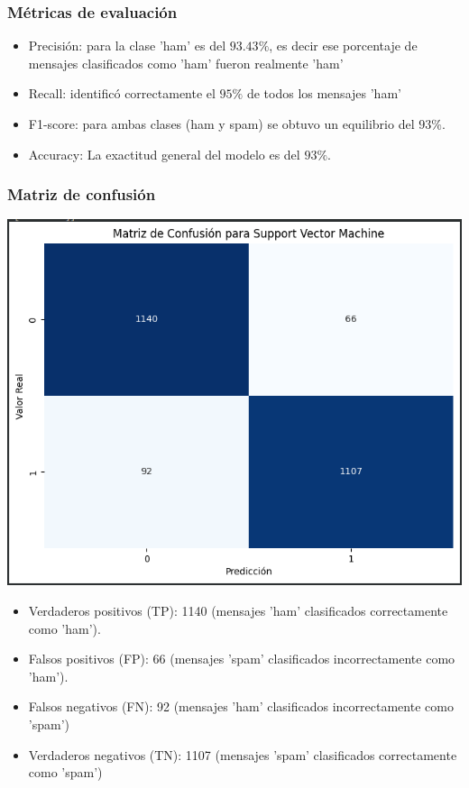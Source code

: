 \subsubsection*{Métricas de evaluación}

\begin{itemize}
\item Precisión: para la clase 'ham' es del $93.43\%$, es decir ese porcentaje de mensajes clasificados como 'ham' fueron realmente 'ham'
\item Recall: identificó correctamente el $95\%$ de todos los mensajes 'ham'
\item F1-score: para ambas clases (ham y spam) se obtuvo un equilibrio del $93\%$.
\item Accuracy: La exactitud general del modelo es del $93\%$.
\end{itemize}

\subsubsection*{Matriz de confusión}

\begin{center}
    \includegraphics[scale = .4]{IMA/SupportVectorMachineMatriz.png}
\end{center}

\begin{itemize}
\item Verdaderos positivos (TP): 1140 (mensajes 'ham' clasificados correctamente como 'ham').
\item Falsos positivos (FP): 66 (mensajes 'spam' clasificados incorrectamente como 'ham').
\item Falsos negativos (FN): 92 (mensajes 'ham' clasificados incorrectamente como 'spam')
\item Verdaderos negativos (TN): 1107 (mensajes 'spam' clasificados correctamente como 'spam')
\end{itemize}

